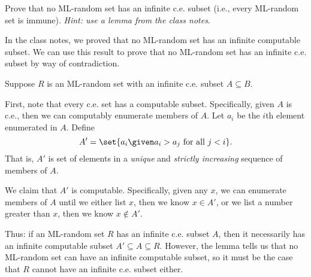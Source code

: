 \begin{problem}
  Prove that no ML-random set has an infinite c.e. subset
  (i.e., every ML-random set is immune). \newline
  \emph{Hint: use a lemma from the class notes}.

  \begin{answer}
    In the class notes, we proved that no ML-random set has an
    infinite computable subset.
    We can use this result to prove that no ML-random set has an
    infinite c.e. subset by way of contradiction.

    Suppose $R$ is an ML-random set with an infinite c.e. subset $A \subseteq B$.
    
    First, note that every c.e. set has a computable subset.
    Specifically, given $A$ is c.e., then we can computably
    enumerate members of $A$.
    Let $a_i$ be the $i$th element enumerated in $A$.
    Define \[ A' = \set{ a_i \given a_i > a_j \text{ for all } j < i }. \]
    That is, $A'$ is set of elements in a \emph{unique} and
    \emph{strictly increasing} sequence of members of $A$.

    We claim that $A'$ is computable.
    Specifically, given any $x$, we can enumerate members of $A$
    until we either list $x$, then we know $x \in A'$,
    or we list a number greater than $x$, then we know $x \notin A'$.

    Thus: if an ML-random set $R$ has an infinite c.e. subset $A$,
    then it necessarily has an infinite computable subset $A' \subseteq A \subseteq R$.
    However, the lemma tells us that no ML-random set can have an
    infinite computable subset, so it must be the case that
    $R$ cannot have an infinite c.e. subset either.
  \end{answer}
\end{problem}
